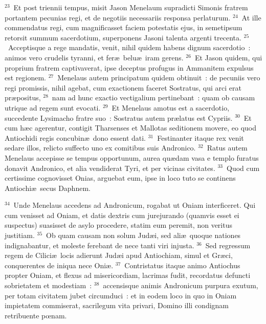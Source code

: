 ${}^{23}$~Et post triennii tempus, misit Jason Menelaum supradicti Simonis fratrem portantem pecunias regi, et de negotiis necessariis responsa perlaturum.
${}^{24}$~At ille commendatus regi, cum magnificasset faciem potestatis ejus, in semetipsum retorsit summum sacerdotium, superponens Jasoni talenta argenti trecenta.
${}^{25}$~Acceptisque a rege mandatis, venit, nihil quidem habens dignum sacerdotio~: animos vero crudelis tyranni, et fer\ae\ belu\ae\ iram gerens.
${}^{26}$~Et Jason quidem, qui proprium fratrem captivaverat, ipse deceptus profugus in Ammanitem expulsus est regionem.
${}^{27}$~Menelaus autem principatum quidem obtinuit~: de pecuniis vero regi promissis, nihil agebat, cum exactionem faceret Sostratus, qui arci erat pr\ae positus,
${}^{28}$~nam ad hunc exactio vectigalium pertinebant~: quam ob causam utrique ad regem sunt evocati.
${}^{29}$~Et Menelaus amotus est a sacerdotio, succedente Lysimacho fratre suo~: Sostratus autem pr\ae latus est Cypriis.
${}^{30}$~Et cum h\ae c agerentur, contigit Tharsenses et Mallotas seditionem movere, eo quod Antiochidi regis concubin\ae\ dono essent dati.
${}^{31}$~Festinanter itaque rex venit sedare illos, relicto suffecto uno ex comitibus suis Andronico.
${}^{32}$~Ratus autem Menelaus accepisse se tempus opportunum, aurea qu\ae dam vasa e templo furatus donavit Andronico, et alia vendiderat Tyri, et per vicinas civitates.
${}^{33}$~Quod cum certissime cognovisset Onias, arguebat eum, ipse in loco tuto se continens Antiochi\ae\ secus Daphnem.


${}^{34}$~Unde Menelaus accedens ad Andronicum, rogabat ut Oniam interficeret. Qui cum venisset ad Oniam, et datis dextris cum jurejurando (quamvis esset ei suspectus) suasisset de asylo procedere, statim eum peremit, non veritus justitiam.
${}^{35}$~Ob quam causam non solum Jud\ae i, sed ali\ae\ quoque nationes indignabantur, et moleste ferebant de nece tanti viri injusta.
${}^{36}$~Sed regressum regem de Cilici\ae\ locis adierunt Jud\ae i apud Antiochiam, simul et Gr\ae ci, conquerentes de iniqua nece Oni\ae .
${}^{37}$~Contristatus itaque animo Antiochus propter Oniam, et flexus ad misericordiam, lacrimas fudit, recordatus defuncti sobrietatem et modestiam~:
${}^{38}$~accensisque animis Andronicum purpura exutum, per totam civitatem jubet circumduci~: et in eodem loco in quo in Oniam impietatem commiserat, sacrilegum vita privari, Domino illi condignam retribuente pœnam.


